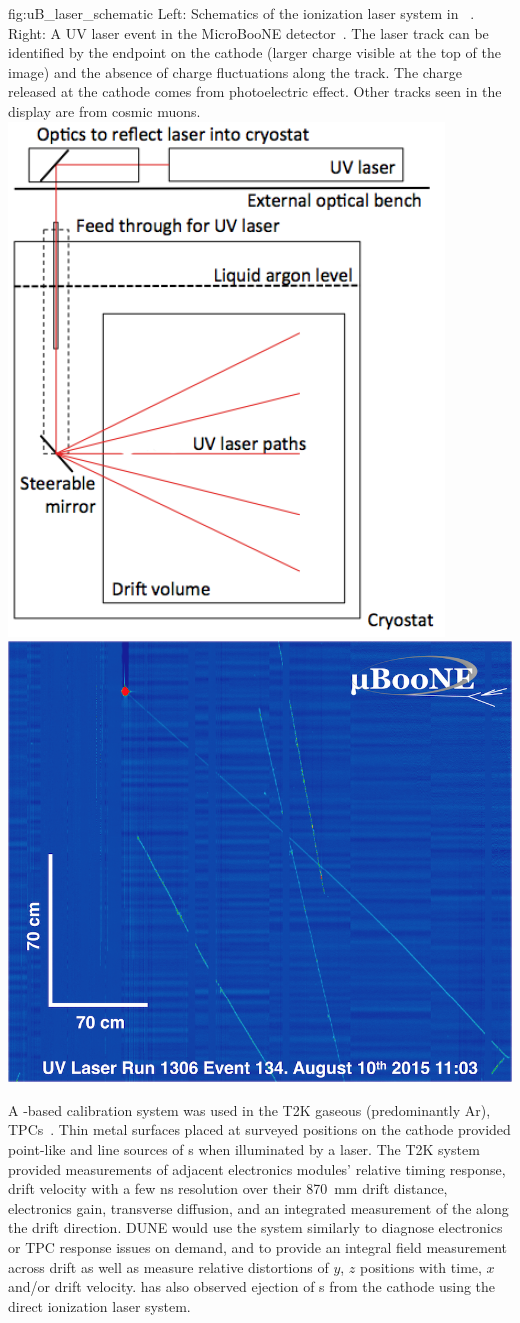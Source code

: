 \begin{dunefigure}{fig:uB_laser_schematic}
{Left: Schematics of the ionization laser system in ~\cite{Antonello:2015lea}. Right: A UV laser event in the MicroBooNE detector~\cite{bib:uBlaser2019}. The laser track can be identified by the endpoint on the cathode (larger charge visible at the top of the image) and the absence of charge fluctuations along the track. The charge released at the cathode comes from photoelectric effect. Other tracks seen in the display are from cosmic muons.}
\includegraphics[width=0.45\linewidth]{graphics/uB_laser_schematic}
\includegraphics[width=0.45\linewidth]{graphics/run1306_ev134-2.png}
\end{dunefigure}

A \phel{}-based calibration system was used in the T2K gaseous (predominantly Ar), TPCs~\cite{Abgrall:2010hi}. 
Thin metal surfaces placed at surveyed positions on the cathode provided point-like and line sources of \phel{}s when illuminated by a laser. The T2K \phel system provided measurements 
of adjacent electronics modules' relative timing response, drift velocity with a few \si{\nano\s} resolution over their \SI{870}{\milli\m} drift distance, electronics gain, 
transverse diffusion, and an integrated measurement of the \efield along the drift direction. DUNE would use the system similarly to diagnose electronics or TPC response issues on demand, and to provide an integral field measurement across drift as well as measure relative distortions of $y$, $z$ positions with time, $x$ and/or drift velocity. \microboone has also observed ejection of \phel{}s from the cathode using the direct ionization laser system. 

